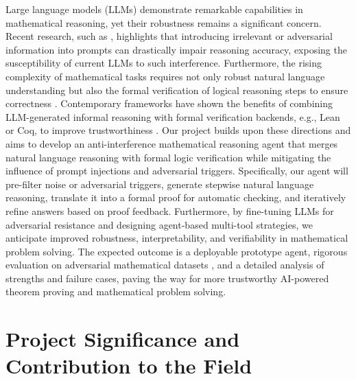\documentclass[a4paper,11pt]{article}
\begin{document}
Large language models (LLMs) demonstrate remarkable capabilities in mathematical reasoning, yet their robustness remains a significant concern. Recent research, such as \cite{rajeev2025cats}, highlights that introducing irrelevant or adversarial information into prompts can drastically impair reasoning accuracy, exposing the susceptibility of current LLMs to such interference. Furthermore, the rising complexity of mathematical tasks requires not only robust natural language understanding but also the formal verification of logical reasoning steps to ensure correctness \cite{ren2025deepseek, liu2025safe, chenSeedProverDeepBroad2025}. Contemporary frameworks have shown the benefits of combining LLM-generated informal reasoning with formal verification backends, e.g., Lean or Coq, to improve trustworthiness \cite{patel2025leantutor, thakur2024context, baba2025proveragent}. Our project builds upon these directions and aims to develop an anti-interference mathematical reasoning agent that merges natural language reasoning with formal logic verification while mitigating the influence of prompt injections and adversarial triggers. Specifically, our agent will pre-filter noise or adversarial triggers, generate stepwise natural language reasoning, translate it into a formal proof for automatic checking, and iteratively refine answers based on proof feedback. Furthermore, by fine-tuning LLMs for adversarial resistance and designing agent-based multi-tool strategies, we anticipate improved robustness, interpretability, and verifiability in mathematical problem solving. The expected outcome is a deployable prototype agent, rigorous evaluation on adversarial mathematical datasets \cite{rajeev2025cats}, and a detailed analysis of strengths and failure cases, paving the way for more trustworthy AI-powered theorem proving and mathematical problem solving.


\section*{Project Significance and Contribution to the Field}
\end{document}
